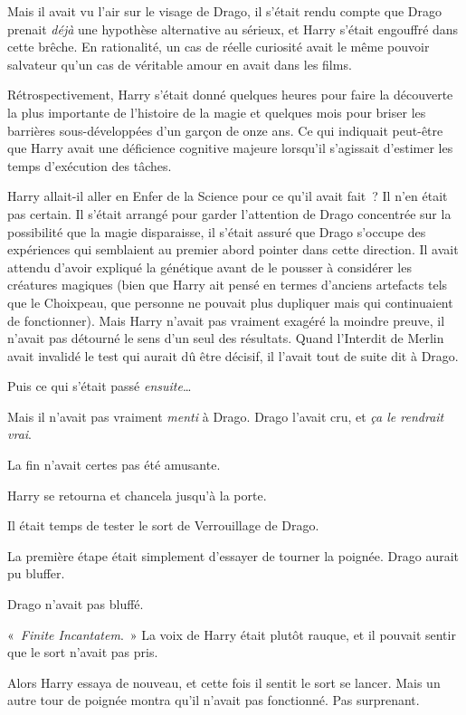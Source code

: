 Mais il avait vu l'air sur le visage de Drago, il s'était rendu compte que Drago prenait \emph{déjà} une hypothèse alternative au sérieux, et Harry s'était engouffré dans cette brêche. En rationalité, un cas de réelle curiosité avait le même pouvoir salvateur qu'un cas de véritable amour en avait dans les films.

Rétrospectivement, Harry s'était donné quelques heures pour faire la découverte la plus importante de l'histoire de la magie et quelques mois pour briser les barrières sous-développées d'un garçon de onze ans. Ce qui indiquait peut-être que Harry avait une déficience cognitive majeure lorsqu'il s'agissait d'estimer les temps d'exécution des tâches.

Harry allait-il aller en Enfer de la Science pour ce qu'il avait fait~? Il n'en était pas certain. Il s'était arrangé pour garder l'attention de Drago concentrée sur la possibilité que la magie disparaisse, il s'était assuré que Drago s'occupe des expériences qui semblaient au premier abord pointer dans cette direction. Il avait attendu d'avoir expliqué la génétique avant de le pousser à considérer les créatures magiques (bien que Harry ait pensé en termes d'anciens artefacts tels que le Choixpeau, que personne ne pouvait plus dupliquer mais qui continuaient de fonctionner). Mais Harry n'avait pas vraiment exagéré la moindre preuve, il n'avait pas détourné le sens d'un seul des résultats. Quand l'Interdit de Merlin avait invalidé le test qui aurait dû être décisif, il l'avait tout de suite dit à Drago.

Puis ce qui s'était passé \emph{ensuite}…

Mais il n'avait pas vraiment \emph{menti} à Drago. Drago l'avait cru, et \emph{ça le rendrait vrai}.

La fin n'avait certes pas été amusante.

Harry se retourna et chancela jusqu'à la porte.

Il était temps de tester le sort de Verrouillage de Drago.

La première étape était simplement d'essayer de tourner la poignée. Drago aurait pu bluffer.

Drago n'avait pas bluffé.

«~\emph{Finite Incantatem}.~» La voix de Harry était plutôt rauque, et il pouvait sentir que le sort n'avait pas pris.

Alors Harry essaya de nouveau, et cette fois il sentit le sort se lancer. Mais un autre tour de poignée montra qu'il n'avait pas fonctionné. Pas surprenant.


